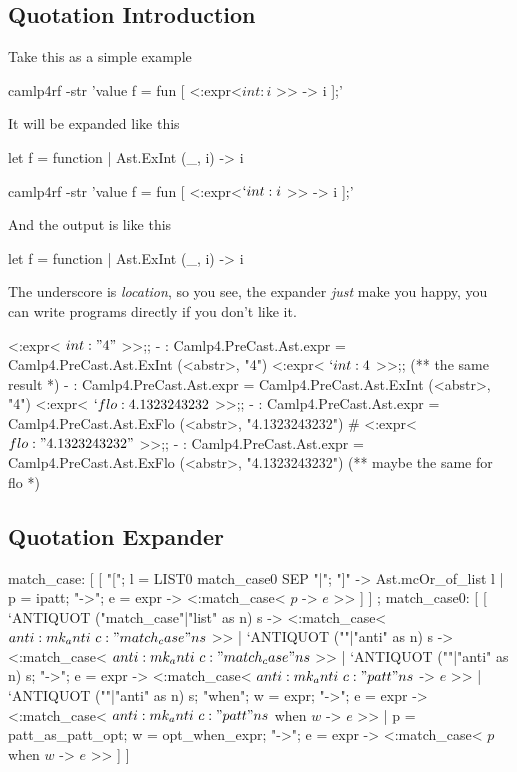 \subsection{Quotation Introduction}
Take this as a simple example

\begin{bashcode}
camlp4rf -str 'value f = fun [ <:expr<$int:i$ >> -> i ];'
\end{bashcode}
It will be expanded like this

\begin{ocamlcode}
let f = function | Ast.ExInt (_, i) -> i
\end{ocamlcode}
\begin{bashcode}
camlp4rf -str 'value f = fun [ <:expr<$`int:i$ >> -> i ];'
\end{bashcode}
And the output is like this

\begin{ocamlcode}
let f = function | Ast.ExInt (_, i) -> i
\end{ocamlcode}
The underscore is \textit{location}, so you see, the expander \textit{just}
make you happy, you can write programs directly if you don't like it.

\begin{ocamlcode}
<:expr< $int: "4"$ >>;;
- : Camlp4.PreCast.Ast.expr = Camlp4.PreCast.Ast.ExInt (<abstr>, "4")
<:expr< $`int: 4$ >>;; (** the same result *)
- : Camlp4.PreCast.Ast.expr = Camlp4.PreCast.Ast.ExInt (<abstr>, "4")
<:expr< $`flo:4.1323243232$ >>;;
- : Camlp4.PreCast.Ast.expr = Camlp4.PreCast.Ast.ExFlo (<abstr>, "4.1323243232")
# <:expr< $flo:"4.1323243232"$ >>;;
- : Camlp4.PreCast.Ast.expr = Camlp4.PreCast.Ast.ExFlo (<abstr>, "4.1323243232")
(** maybe the same for flo *)
\end{ocamlcode}

\subsection{Quotation Expander}

\begin{ocamlcode}
    match_case:
      [ [ "["; l = LIST0 match_case0 SEP "|"; "]" -> Ast.mcOr_of_list l
        | p = ipatt; "->"; e = expr -> <:match_case< $p$ -> $e$ >> ] ]
    ;
    match_case0:
      [ [ `ANTIQUOT ("match_case"|"list" as n) s ->
            <:match_case< $anti:mk_anti ~c:"match_case" n s$ >>
        | `ANTIQUOT (""|"anti" as n) s ->
            <:match_case< $anti:mk_anti ~c:"match_case" n s$ >>
        | `ANTIQUOT (""|"anti" as n) s; "->"; e = expr ->
            <:match_case< $anti:mk_anti ~c:"patt" n s$ -> $e$ >>
        | `ANTIQUOT (""|"anti" as n) s; "when"; w = expr; "->"; e = expr ->
            <:match_case< $anti:mk_anti ~c:"patt" n s$ when $w$ -> $e$ >>
        | p = patt_as_patt_opt; w = opt_when_expr; "->"; e = expr -> <:match_case< $p$ when $w$ -> $e$ >>
      ] ]
\end{ocamlcode}
    
